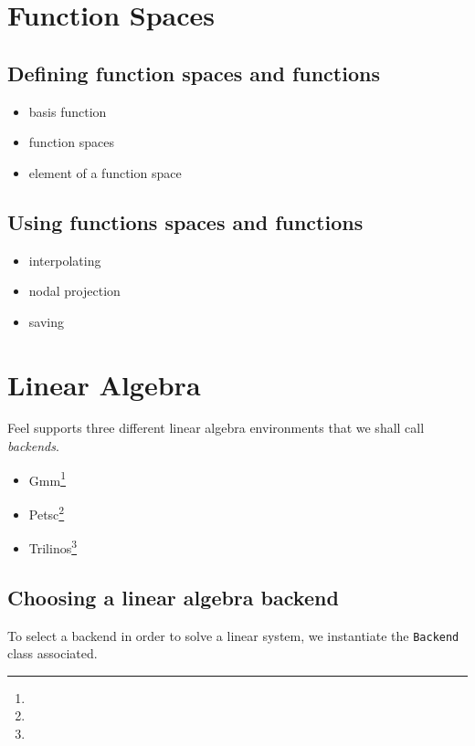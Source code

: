 \documentclass[a4paper]{book}
\newcommand{\feel}{Feel\xspace}
\begin{document}
\section{Function Spaces}
\label{sec:function-spaces}

\subsection{Defining function spaces and functions}

\begin{itemize}
\item basis function
\item function spaces
\item element of a function space
\end{itemize}

\subsection{Using functions spaces and functions}

\begin{itemize}
\item interpolating
\item nodal projection
\item saving
\end{itemize}


\section{Linear Algebra}
\label{sec:linear-algebra}


\feel supports three different linear algebra environments that we
shall call \emph{backends}.
\begin{itemize}
\item Gmm\footnote{}
\item Petsc\footnote{}
\item Trilinos\footnote{}
\end{itemize}


\subsection{Choosing a linear algebra backend}
\label{sec:choos-line-algebra}

To select a backend in order to solve a linear system, we instantiate
the \lstinline!Backend! class associated.
\end{document}
